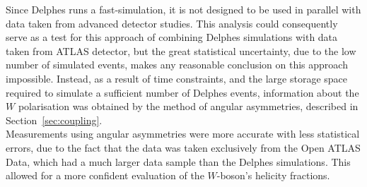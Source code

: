 \documentclass[12pt,a4paper]{article}
\numberwithin{equation}{section}
\begin{document}
Since Delphes runs a fast-simulation, it is not designed to be used in parallel
with data taken from advanced detector studies. This analysis could consequently
serve as a test for this approach of combining Delphes simulations with data
taken from ATLAS detector, but the great statistical uncertainty, due to the low
number of simulated events, makes any reasonable conclusion on this approach
impossible. Instead, as a result of time constraints, and the large storage
space required to simulate a sufficient number of Delphes events, information
about the $W$ polarisation was obtained by the method of angular
asymmetries, described in Section~\ref{sec:coupling}.\\

Measurements using angular asymmetries were more accurate with less statistical
errors, due to the fact that the data was taken exclusively from the Open ATLAS
Data, which had a much larger data sample than the Delphes simulations. This
allowed for a more confident evaluation of the $W$-boson's helicity fractions.\\








\end{document}
